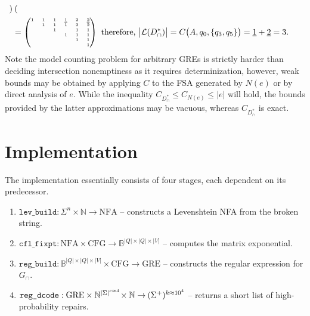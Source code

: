 \documentclass[sigplan,acmsmall,nonacm,screen]{acmart}\settopmatter{printfolios=false,printccs=false,printacmref=false}
\begin{document}
\begin{align}
\begin{tiny}
\begin{pmatrix}
  \end{pmatrix}\end{tiny}\\
  &= \begin{tiny}\begin{pmatrix}
    1   & 1  & 1  & \underline{1} & 2 & \underline{2} \\
        & 1  & 1  & 1 & 2 & 2 \\
        &    & 1  &   & 1 & 1 \\
        &    &    & 1 & 1 & 1 \\
        &    &    &   & 1 & 1 \\
        &    &    &   &   & 1 \\
\end{pmatrix}\end{tiny} \text{ therefore, } \big|\mathcal{L}(D_\cap^*)\big| = C\big(A, q_0, \{q_3, q_5\}\big) = \underline{1} + \underline{2} = 3.
\end{align}
Note the model counting problem for arbitrary GREs is strictly harder than deciding intersection nonemptiness as it requires determinization, however, weak bounds may be obtained by applying $C$ to the FSA generated by $N(e)$ or by direct analysis of $e$. While the inequality $C_{D_\cap^*} \leq C_{N(e)} \leq |e|$ will hold, the bounds provided by the latter approximations may be vacuous, whereas $C_{D_\cap^*}$ is exact.

\clearpage\section{Implementation}\label{sec:implementation}

The implementation essentially consists of four stages, each dependent on its predecessor.

\begin{enumerate}
  \item $\texttt{lev\_build}: \Sigma^n \times \mathbb{N} \rightarrow \text{NFA}$ -- constructs a Levenshtein NFA from the broken string.
  \item $\texttt{cfl\_fixpt}: \text{NFA} \times \text{CFG} \rightarrow \mathbb{B}^{|Q|\times |Q| \times |V|}$ -- computes the matrix exponential.
  \item $\texttt{reg\_build}: \mathbb{B}^{|Q|\times |Q| \times |V|} \times \text{CFG} \rightarrow \text{GRE}$ -- constructs the regular expression for $G_\cap$.
  \item $\texttt{reg\_dcode}: \text{GRE} \times \mathbb{N}^{|\Sigma|^{c\approx 4}} \hspace{-0.05cm}\times \mathbb{N} \rightarrow\hspace{-0.02cm} (\Sigma^+)^{k\approx 10^4}$ -- returns a short list of high-probability repairs.
\end{enumerate}
\end{document}
